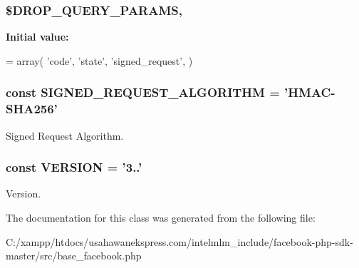 \hypertarget{class_base_facebook_a4a197673d978b05709df6e2240e545c6}{
\subsubsection[{\$\-D\-R\-O\-P\-\_\-\-Q\-U\-E\-R\-Y\-\_\-\-P\-A\-R\-A\-M\-S}]{\setlength{\rightskip}{0pt plus 5cm}\$D\-R\-O\-P\-\_\-\-Q\-U\-E\-R\-Y\-\_\-\-P\-A\-R\-A\-M\-S\hspace{0.3cm}{\ttfamily [static]}, {\ttfamily [protected]}}}\label{class_base_facebook_a4a197673d978b05709df6e2240e545c6}
{\bfseries Initial value\-:}
\begin{DoxyCode}
= array(
    \textcolor{stringliteral}{'code'},
    \textcolor{stringliteral}{'state'},
    \textcolor{stringliteral}{'signed\_request'},
  )
\end{DoxyCode}
\hypertarget{class_base_facebook_a8f8dcc1f4e368bc6d61d133ef222ded0}{
\subsubsection[{S\-I\-G\-N\-E\-D\-\_\-\-R\-E\-Q\-U\-E\-S\-T\-\_\-\-A\-L\-G\-O\-R\-I\-T\-H\-M}]{\setlength{\rightskip}{0pt plus 5cm}const S\-I\-G\-N\-E\-D\-\_\-\-R\-E\-Q\-U\-E\-S\-T\-\_\-\-A\-L\-G\-O\-R\-I\-T\-H\-M = 'H\-M\-A\-C-\/S\-H\-A256'}}\label{class_base_facebook_a8f8dcc1f4e368bc6d61d133ef222ded0}
Signed Request Algorithm. \hypertarget{class_base_facebook_af71005841ce53adac00581ab0ba24c1f}{
\subsubsection[{V\-E\-R\-S\-I\-O\-N}]{\setlength{\rightskip}{0pt plus 5cm}const V\-E\-R\-S\-I\-O\-N = '3..'}}\label{class_base_facebook_af71005841ce53adac00581ab0ba24c1f}
Version. 

The documentation for this class was generated from the following file\-:\begin{DoxyCompactItemize}
\item 
C\-:/xampp/htdocs/usahawanekspress.\-com/intelmlm\-\_\-include/facebook-\/php-\/sdk-\/master/src/base\-\_\-facebook.\-php\end{DoxyCompactItemize}
